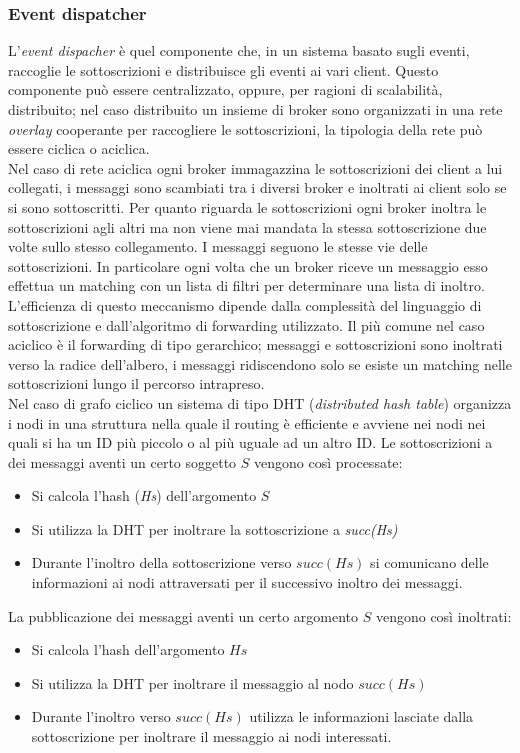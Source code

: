 \subsubsection{Event dispatcher}
L'\emph{event dispacher} è quel componente che, in un sistema basato sugli eventi, raccoglie le sottoscrizioni e distribuisce gli eventi ai vari client. Questo componente può essere centralizzato, oppure, per ragioni di scalabilità, distribuito; nel caso distribuito un insieme di broker sono organizzati in una rete \emph{overlay} cooperante per raccogliere le sottoscrizioni, la tipologia della rete può essere ciclica o aciclica.\\
Nel caso di rete aciclica ogni broker immagazzina le sottoscrizioni dei client a lui collegati, i messaggi sono scambiati tra i diversi broker e inoltrati ai client solo se si sono sottoscritti.
Per quanto riguarda le sottoscrizioni ogni broker inoltra le sottoscrizioni agli altri ma non viene mai mandata la stessa sottoscrizione due volte sullo stesso collegamento. I messaggi seguono le stesse vie delle sottoscrizioni. In particolare ogni volta che un broker riceve un messaggio esso effettua un matching con un lista di filtri per determinare una lista di inoltro. L'efficienza di questo meccanismo dipende dalla complessità del linguaggio di sottoscrizione e dall'algoritmo di forwarding utilizzato. Il più comune nel caso aciclico è il forwarding di tipo gerarchico; messaggi e sottoscrizioni sono inoltrati verso la radice dell'albero, i messaggi ridiscendono solo se esiste un matching nelle sottoscrizioni lungo il percorso intrapreso.\\
Nel caso di grafo ciclico un sistema di tipo DHT (\emph{distributed hash table}) organizza i nodi in una struttura nella quale il routing è efficiente e avviene nei nodi nei quali si ha un ID più piccolo o al più uguale ad un altro ID.
Le sottoscrizioni a dei messaggi aventi un certo soggetto $S$ vengono così processate:
\begin{itemize}
\item Si calcola l'hash (\emph{Hs}) dell'argomento $S$ 
\item Si utilizza la DHT per inoltrare la sottoscrizione a \emph{succ(Hs)}
\item Durante l'inoltro della sottoscrizione verso $succ(Hs)$ si comunicano delle informazioni ai nodi attraversati per il successivo inoltro dei messaggi.
\end{itemize}
La pubblicazione dei messaggi aventi un certo argomento $S$ vengono così inoltrati:
\begin{itemize}
\item Si calcola l'hash dell'argomento $Hs$
\item Si utilizza la DHT per inoltrare il messaggio al nodo $succ(Hs)$
\item Durante l'inoltro verso $succ(Hs)$ utilizza le informazioni lasciate dalla sottoscrizione per inoltrare il messaggio ai nodi interessati.
\end{itemize}
